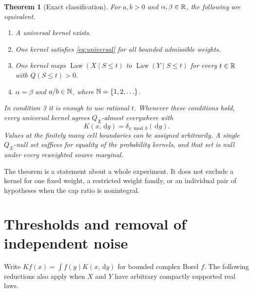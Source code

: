 \documentclass[11pt,a4paper]{article}
\newtheorem{theorem}{Theorem}[section]
\theoremstyle{remark}\newtheorem*{ednote}{Editorial note (ProveIt, 2026-10-01)}
\newcommand{\Law}{\operatorname{Law}}\newcommand{\ind}{\mathbf1}
\newcommand{\dd}{\,\mathrm d}\newcommand{\ii}{\mathrm i}
\begin{document}
\begin{theorem}[Exact classification]\label{thm:main}
For $a,b>0$ and $\alpha,\beta\in\mathbb R$, the following are equivalent.
\begin{enumerate}
 \item A universal kernel exists.
 \item One kernel satisfies \eqref{eq:universal} for all bounded admissible weights.
 \item One kernel maps $\Law(X\mid S\le t)$ to $\Law(Y\mid S\le t)$ for every $t\in\mathbb R$ with $Q(S\le t)>0$.
 \item $\alpha=\beta$ and $a/b\in\mathbb N$, where $\mathbb N=\{1,2,\ldots\}$.
\end{enumerate}
In condition 3 it is enough to use rational $t$. Whenever these conditions hold, every universal kernel agrees $Q_X$-almost everywhere with
\begin{equation}\label{eq:modulo}
 K(x,\dd y)=\delta_{x\bmod b}(\dd y).
\end{equation}
Values at the finitely many cell boundaries can be assigned arbitrarily. A single $Q_X$-null set suffices for equality of the probability kernels, and that set is null under every reweighted source marginal.
\end{theorem}

The theorem is a statement about a whole experiment. It does not exclude a kernel for one fixed weight, a restricted weight family, or an individual pair of hypotheses when the cap ratio is nonintegral.

\section{Thresholds and removal of independent noise}
Write $Kf(x)=\int f(y)K(x,\dd y)$ for bounded complex Borel $f$. The following reductions also apply when $X$ and $Y$ have arbitrary compactly supported real laws.
\end{document}

